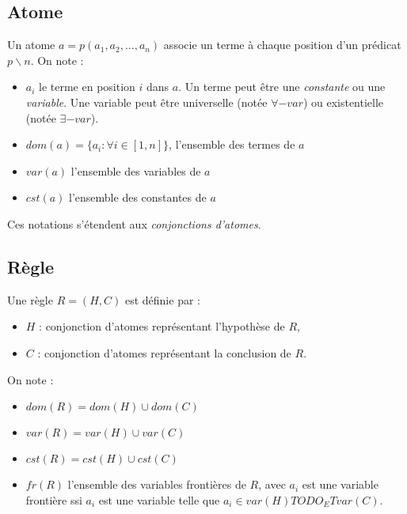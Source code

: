 \subsection{Atome}
	Un atome $a = p(a_{1},a_{2},...,a_{n})$ associe un terme \`a chaque position d'un pr\'edicat $p \backslash n$.
	On note :
	\begin{itemize}
		\item $a_{i}$ le terme en position $i$ dans $a$. Un terme peut \^etre une {\em constante} ou une {\em variable}.
		Une variable peut \^etre universelle (not\'ee $\forall-var$) ou existentielle (not\'ee $\exists-var$).
		\item $dom(a) = \{a_{i} : \forall i \in [1,n]\}$, l'ensemble des termes de $a$
		\item $var(a)$ l'ensemble des variables de $a$
		\item $cst(a)$ l'ensemble des constantes de $a$
	\end{itemize}
	Ces notations s'\'etendent aux {\em conjonctions d'atomes}.

\subsection{R\`egle}
	Une r\`egle $R = (H,C)$ est d\'efinie par :
	\begin{itemize}
		\item $H$ : conjonction d'atomes repr\'esentant l'hypoth\`ese de $R$,
		\item $C$ : conjonction d'atomes repr\'esentant la conclusion de $R$.
	\end{itemize}
	On note :
	\begin{itemize}
		\item $dom(R) = dom(H) \cup dom(C)$
		\item $var(R) = var(H) \cup var(C)$
		\item $cst(R) = cst(H) \cup cst(C)$
		\item $fr(R)$ l'ensemble des variables fronti\`eres de $R$, avec $a_{i}$ est une variable fronti\`ere ssi $a_{i}$ est une variable telle que $a_{i} \in var(H) TODO_ET var(C)$.
	\end{itemize}


